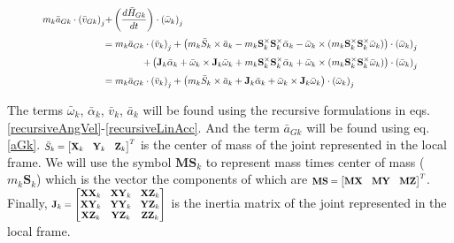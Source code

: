 \documentclass[a4paper,10pt]{article}
\newcommand\scalemath[2]{\scalebox{#1}{\mbox{\ensuremath{\displaystyle #2}}}}
\begin{document}
\begin{align}
 \scalemath{0.775}{m_k \bar{a}_{Gk} \cdot \left(\bar{v}_{Gk}\right)_j} &\scalemath{0.775}{ + \left( \frac{d\bar{H}_{Gk}}{dt} \right) \cdot \left( \bar\omega_k \right)_j} \nonumber \\
 &\scalemath{0.775}{=  m_k \bar{a}_{Gk} \cdot \left(\bar{v}_k\right)_j + \left( m_k \bar{S}_k \times \bar{a}_k -  m_k \mathbf{S}^{\times}_k \mathbf{S}^{\times}_k \bar{\alpha}_k - \bar{\omega}_k \times (m_k \mathbf{S}^{\times}_k \mathbf{S}^{\times}_k \bar{\omega}_k) \right) \cdot  \left(\bar{\omega}_k\right)_j} \nonumber \\
 &\scalemath{0.775}{\hspace{40pt}+\left(\mathbf{J}_{k} \bar{\alpha}_k + \bar{\omega}_k \times \mathbf{J}_{k} \bar{\omega}_k + m_k\mathbf{S}^{\times}_k\mathbf{S}^{\times}_k\bar{\alpha}_k + \bar{\omega}_k \times (m_k\mathbf{S}^{\times}_k\mathbf{S}^{\times}_k \bar{\omega}_k)\right) \cdot \left( \bar\omega_k \right)_j} \nonumber \\
 &\scalemath{0.775}{=  m_k \bar{a}_{Gk} \cdot \left(\bar{v}_k\right)_j + \left( m_k \bar{S}_k \times \bar{a}_k + \mathbf{J}_{k} \bar{\alpha}_k + \bar{\omega}_k \times \mathbf{J}_{k} \bar{\omega}_k\right) \cdot  \left(\bar{\omega}_k\right)_j} \label{kanesTree1}
\end{align}

The terms $\bar\omega_k$, $\bar\alpha_k$, $\bar{v}_k$, $\bar{a}_k$ will be found using the recursive formulations in eqs. \ref{recursiveAngVel}-\ref{recursiveLinAcc}. And the 
term $\bar{a}_{Gk}$ will be found using eq.\ref{aGk}. $\scalemath{0.75}{\bar{S}_k=\left[\begin{matrix} \mathbf{X}_k & \mathbf{Y}_k & \mathbf{Z}_k \end{matrix}\right]^T}$ 
is the center of mass of the joint represented in the local frame. We will use the symbol $\mathbf{MS}_k$ to represent mass times center of mass ($m_k\mathbf{S}_k$) which is
the vector the components of which are $\scalemath{0.75}{\mathbf{MS}=\left[\begin{matrix} \mathbf{MX} & \mathbf{MY} & \mathbf{MZ} \end{matrix}\right]^T}$. 
Finally, $\scalemath{0.75}{\mathbf{J}_k=\left[\begin{matrix} \mathbf{XX}_k & \mathbf{XY}_k & \mathbf{XZ}_k \\ \mathbf{XY}_k & \mathbf{YY}_k & \mathbf{YZ}_k \\ \mathbf{XZ}_k & \mathbf{YZ}_k & \mathbf{ZZ}_k \end{matrix}\right]}$ is the inertia matrix of the joint represented in the local frame.
\end{document}
